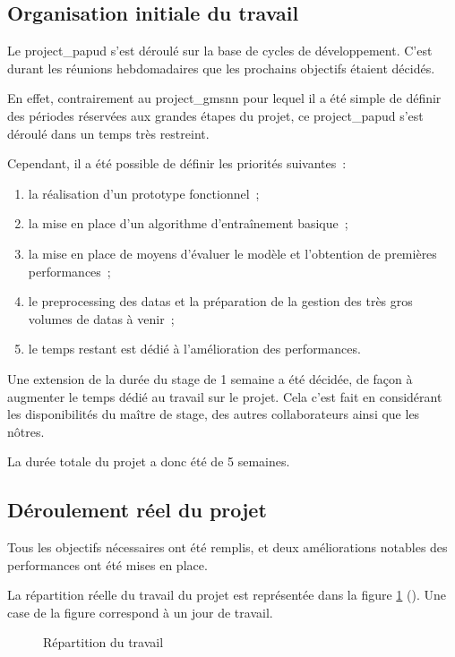\subsection{Organisation initiale du travail}
Le \gls{project_papud} s'est déroulé sur la base de cycles de développement.
C'est durant les réunions hebdomadaires que les prochains objectifs étaient décidés.

En effet, contrairement au \gls{project_gmsnn} pour lequel il a été simple de définir des périodes réservées aux grandes étapes du projet, ce \gls{project_papud} s'est déroulé dans un temps très restreint.

\pagebreak
Cependant, il a été possible de définir les priorités suivantes~:
\begin{enumerate}
	\item la réalisation d'un prototype fonctionnel~;
	\item la mise en place d'un algorithme d'entraînement basique~;
	\item la mise en place de moyens d'évaluer le modèle et l'obtention de premières performances~;
	\item le \gls{preprocessing} des \glspl{data} et la préparation de la gestion des très gros volumes de \glspl{data} à venir~;
	\item le temps restant est dédié à l'amélioration des performances.
\end{enumerate}
\hspace{1em}

Une extension de la durée du stage de 1 semaine a été décidée, de façon à augmenter le temps dédié au travail sur le projet.
Cela c'est fait en considérant les disponibilités du maître de stage, des autres collaborateurs ainsi que les nôtres.

La durée totale du projet a donc été de 5 semaines.

\subsection{Déroulement réel du projet}
Tous les objectifs nécessaires ont été remplis, et deux améliorations notables des performances ont été mises en place.

La répartition réelle du travail du projet est représentée dans la figure \ref{fig:papud_time} (). Une case de la figure correspond à un jour de travail.

\begin{figure}[ht]
	\centering
	\caption[Répartition du travail]{Répartition du travail}\label{fig:papud_time}
\end{figure}

